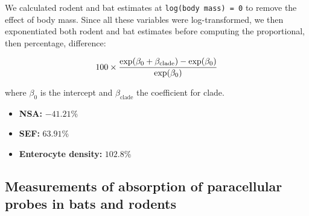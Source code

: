 \documentclass[12pt,]{article}
\providecommand{\tightlist}{%
  \setlength{\itemsep}{0pt}\setlength{\parskip}{0pt}}
\let\originalleft\left
\let\originalright\right
\renewcommand{\left}{\mathopen{}\mathclose\bgroup\originalleft}
\renewcommand{\right}{\aftergroup\egroup\originalright}
\begin{document}
We calculated rodent and bat estimates at \texttt{log(body\ mass)\ =\ 0} to remove the effect
of body mass.
Since all these variables were log-transformed, we then exponentiated
both rodent and bat estimates before computing the proportional, then percentage,
difference:

\begin{equation}
    100 \times \frac{ \exp\left( \beta_0 + \beta_{\text{clade}} \right) - 
        \exp\left( \beta_0 \right) }{ \exp\left( \beta_0 \right) }
\end{equation}

where \(\beta_0\) is the intercept and \(\beta_{\text{clade}}\) the coefficient for clade.

\begin{itemize}
\tightlist
\item
  \textbf{NSA:} \(-41.21\)\%
\item
  \textbf{SEF:} \(63.91\)\%
\item
  \textbf{Enterocyte density:} \(102.8\)\%
\end{itemize}

\subsection{Measurements of absorption of paracellular probes in bats and rodents}
\end{document}
